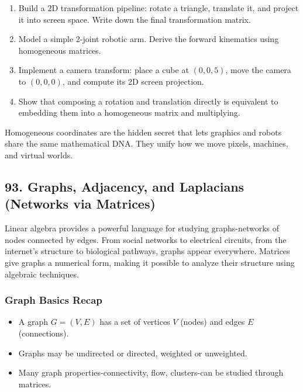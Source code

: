 \documentclass[
  letterpaper,
  DIV=11,
  numbers=noendperiod]{scrreprt}
\providecommand{\tightlist}{%
  \setlength{\itemsep}{0pt}\setlength{\parskip}{0pt}}
\begin{document}
\begin{enumerate}
\def\labelenumi{\arabic{enumi}.}
\tightlist
\item
  Build a 2D transformation pipeline: rotate a triangle, translate it,
  and project it into screen space. Write down the final transformation
  matrix.
\item
  Model a simple 2-joint robotic arm. Derive the forward kinematics
  using homogeneous matrices.
\item
  Implement a camera transform: place a cube at \((0,0,5)\), move the
  camera to \((0,0,0)\), and compute its 2D screen projection.
\item
  Show that composing a rotation and translation directly is equivalent
  to embedding them into a homogeneous matrix and multiplying.
\end{enumerate}

Homogeneous coordinates are the hidden secret that lets graphics and
robots share the same mathematical DNA. They unify how we move pixels,
machines, and virtual worlds.

\subsection{93. Graphs, Adjacency, and Laplacians (Networks via
Matrices)}\label{graphs-adjacency-and-laplacians-networks-via-matrices}

Linear algebra provides a powerful language for studying graphs-networks
of nodes connected by edges. From social networks to electrical
circuits, from the internet's structure to biological pathways, graphs
appear everywhere. Matrices give graphs a numerical form, making it
possible to analyze their structure using algebraic techniques.

\subsubsection{Graph Basics Recap}\label{graph-basics-recap}

\begin{itemize}
\tightlist
\item
  A graph \(G = (V, E)\) has a set of vertices \(V\) (nodes) and edges
  \(E\) (connections).
\item
  Graphs may be undirected or directed, weighted or unweighted.
\item
  Many graph properties-connectivity, flow, clusters-can be studied
  through matrices.
\end{itemize}
\end{document}
